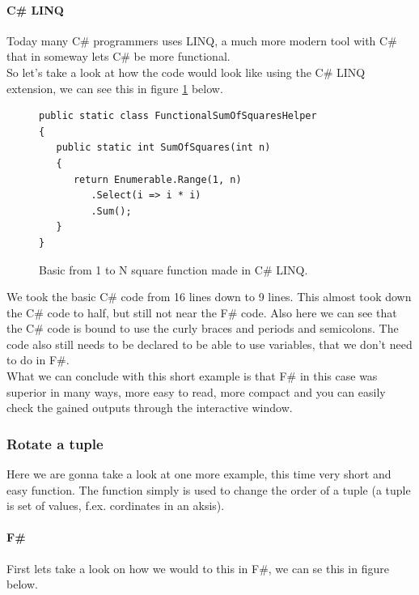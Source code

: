 \documentclass[12pt, a4paper]{article}
\begin{document}
\newpage

\paragraph{C\# LINQ}
Today many C\# programmers uses LINQ, a much more modern tool with C\# that in someway lets C\# be more functional.\\

So let’s take a look at how the code would look like using the C\# LINQ extension, we can see this in figure \ref{fig:SquareFunctionCSharpLINQ} below.

\begin{figure}[!h]
\begin{lstlisting}
public static class FunctionalSumOfSquaresHelper
{
   public static int SumOfSquares(int n)
   {
      return Enumerable.Range(1, n)
         .Select(i => i * i)
         .Sum();
   }
}
\end{lstlisting}
\caption{Basic from 1 to N square function made in C\# LINQ.}
\label{fig:SquareFunctionCSharpLINQ}
\end{figure}

We took the basic C\# code from 16 lines down to 9 lines. This almost took down the C\# code to half, but still not near the F\# code. Also here we can see that the C\# code is bound to use the  curly braces and periods and semicolons. The code also still needs to be declared to be able to use variables, that we don’t need to do in F\#.\\

What we can conclude with this short example is that F\# in this case was superior in many ways, more easy to read, more compact and you can easily check the gained outputs through the interactive window. 

\newpage
\subsubsection{Rotate a tuple}
Here we are gonna take a look at one more example, this time very short and easy function. The function simply is used to change the order of a tuple (a tuple is set of values, f.ex. cordinates in an aksis).\\
   
\paragraph{F\#}
First lets take a look on how we would to this in F\#, we can se this in figure below.
\end{document}
